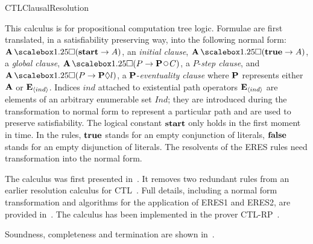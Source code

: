 \begin{entry}{CTLClausalResolution}
 \begin{clarifications}
This calculus is for propositional computation tree logic.
Formulae are first translated, in a satisfiability preserving way,
into the following normal form: 
$\allpaths \Always (\lstart \rightarrow A)$, an \emph{initial clause},
$\allpaths  \Always (\ltrue \rightarrow A)$, a \emph{global clause},
$\allpaths \Always (P \rightarrow  \eitherpath \Next C)$,  
a $P$-\emph{step clause}, and
$\allpaths  \Always  (P   \rightarrow  \eitherpath \Eventually l)$,
a $\mathbf{P}$-\emph{eventuality clause} 
where $\mathbf{P}$ represents  either $\mathbf A$ or $\mathbf{E}_{\langle ind \rangle}$.
%
Indices $\mathit{ind}$ attached to existential path operators 
$\mathbf{E}_{\langle ind \rangle}$ are elements of an arbitrary enumerable set
$\mathit{Ind}$; they are introduced during the transformation to normal
form to represent a particular path and are used to
preserve satisfiability.
% 
The logical constant ${\mathbf{start}}$ only holds in the first moment in time. 
%
%
In the rules, ${\mathbf{true}}$ stands for an empty conjunction of literals,  
${\mathbf{false}}$ stands for an empty disjunction of literals.
The resolvents of the ERES rules need transformation
into the normal form. 
%
\end{clarifications}

\begin{history}
The calculus was first presented
in~\cite{Zhang+Hustadt+Dixon@CADE2009}.
It removes two redundant rules from an earlier resolution calculus for
CTL~\cite{BF99:jetai}.
Full details, including a normal form transformation and algorithms
for the application of ERES1 and ERES2, are provided in~\cite{Zhang+Hustadt+Dixon@ToCL2014}. 
The calculus has been implemented in the prover
CTL-RP~\cite{Zhang+Hustadt+Dixon@AIC2010}. 
\end{history}

\begin{technicalities}
Soundness, completeness and termination are shown in~\cite{Zhang+Hustadt+Dixon@ToCL2014}.
\end{technicalities}



\end{entry}

